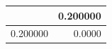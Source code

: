 \begin{tabular}{lr}
\toprule
 & 0.200000 \\
\midrule
0.200000 & 0.0000 \\
\bottomrule
\end{tabular}
